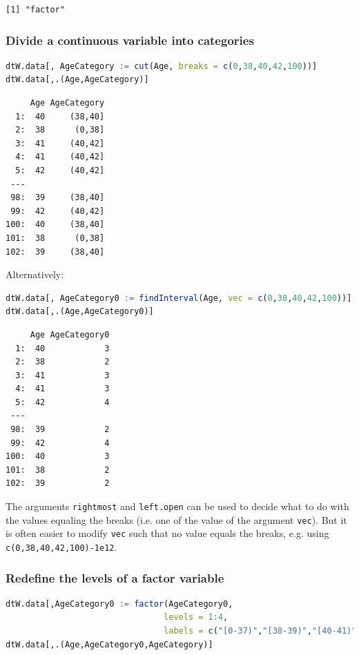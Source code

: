 \documentclass{article}
\begin{document}
\label{}
\begin{verbatim}
[1] "factor"
\end{verbatim}
\subsubsection{Divide a continuous variable into categories}
\label{sec:orga96ee90}

\begin{lstlisting}[language=r,numbers=none]
dtW.data[, AgeCategory := cut(Age, breaks = c(0,38,40,42,100))]
dtW.data[,.(Age,AgeCategory)]
\end{lstlisting}

\label{}
\begin{verbatim}
     Age AgeCategory
  1:  40     (38,40]
  2:  38      (0,38]
  3:  41     (40,42]
  4:  41     (40,42]
  5:  42     (40,42]
 ---                
 98:  39     (38,40]
 99:  42     (40,42]
100:  40     (38,40]
101:  38      (0,38]
102:  39     (38,40]
\end{verbatim}

Alternatively:
\begin{lstlisting}[language=r,numbers=none]
dtW.data[, AgeCategory0 := findInterval(Age, vec = c(0,38,40,42,100))]
dtW.data[,.(Age,AgeCategory0)]
\end{lstlisting}

\label{}
\begin{verbatim}
     Age AgeCategory0
  1:  40            3
  2:  38            2
  3:  41            3
  4:  41            3
  5:  42            4
 ---                 
 98:  39            2
 99:  42            4
100:  40            3
101:  38            2
102:  39            2
\end{verbatim}

The arguments \texttt{rightmost} and \texttt{left.open} can be used to decide what
to do with the values equaling the breaks (i.e. one of the value of
the argument \texttt{vec}). But it is often easier to modify \texttt{vec} such that no value
equals the breaks, e.g. using \texttt{c(0,38,40,42,100)-1e12}.
\subsubsection{Redefine the levels of a factor variable}
\label{sec:orgdadd33b}

\begin{lstlisting}[language=r,numbers=none]
dtW.data[,AgeCategory0 := factor(AgeCategory0, 
                                levels = 1:4, 
                                labels = c("[0-37)","[38-39)","[40-41)","[42-100)"))]
dtW.data[,.(Age,AgeCategory0,AgeCategory)]
\end{lstlisting}
\end{document}
